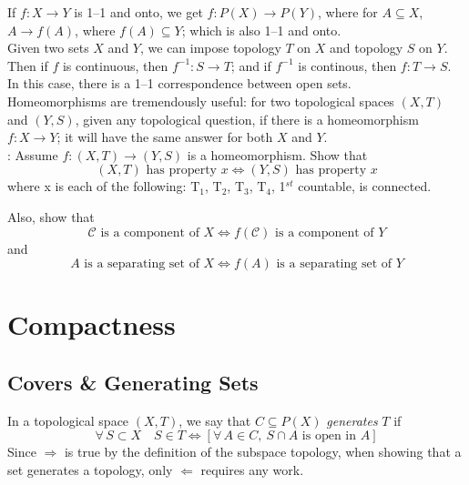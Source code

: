 \documentclass[12pt]{report}
\newcommand{\exercise}{ \noindent{\sc Exercise }\hspace{5pt} }
\newcommand{\define}{  \noindent{\sc Definition }\hspace{5pt} }
\newcommand{\fall}{\forall\,}
\newcommand{\T}[1]{$\textrm{T}_#1$}
\begin{document}
If $f:X\rightarrow Y$ is 1--1 and onto, we get $f:P(X) \rightarrow P(Y)$,
where for $A \subseteq X$, $A \rightarrow f(A)$, where $f(A) \subseteq Y$;
which is also 1--1 and onto.\\

Given two sets $X$ and $Y$, we can impose topology $T$ on $X$ and topology
$S$ on $Y$. Then if $f$ is continuous, then $f^{-1}:S\rightarrow T$; and if
$f^{-1}$ is continous, then $f: T \rightarrow S$. In this case, there is a
1--1 correspondence between open sets.\\

Homeomorphisms are tremendously useful: for two topological spaces $(X,T)$ and
$(Y,S)$, given any topological question, if there is a homeomorphism $f:X
\rightarrow Y$; it will have the same answer for both $X$ and $Y$.\\

\exercise: Assume $f:(X,T) \rightarrow (Y,S)$ is a homeomorphism. Show that 
\begin{displaymath}
(X,T) \textrm{ has property } x \iff (Y,S) \textrm{ has property } x
\end{displaymath}
where x is each of the following: \T{1}, \T{2}, \T{3}, \T{4}, 1$^{st}$
countable, is connected.

Also, show that 
\begin{displaymath}
\mathcal{C} \textrm{ is a component of } X \iff f(\mathcal{C}) \textrm { is a
component of } Y
\end{displaymath}
and
\begin{displaymath}
A \textrm{ is a separating set of } X \iff f(A) \textrm{ is a separating set of } Y
\end{displaymath}


\section{Compactness} 

\subsection{Covers \& Generating Sets} 
\define In a topological space $(X,T)$, we say that $C \subseteq P(X)$
 {\em generates} $T$ if 
\begin{displaymath}
\fall S \subset X\quad S \in T \iff [\fall A \in C,\ S \cap A \textrm{ is open
in } A]
\end{displaymath}
Since $\Rightarrow$ is true by the definition of the subspace topology, when
showing that a set generates a topology, only $\Leftarrow$ requires any
work.\\
\end{document}
